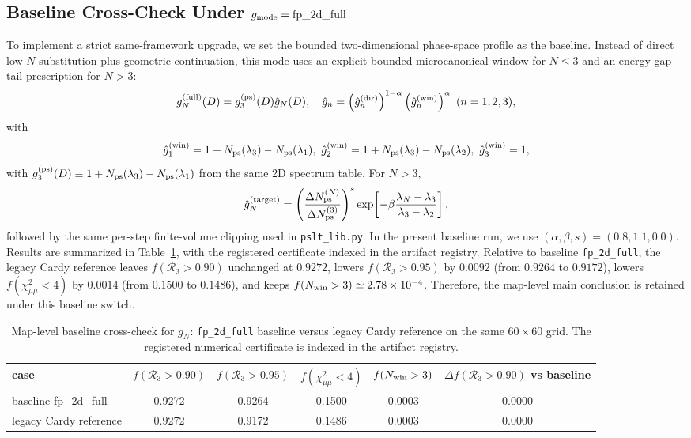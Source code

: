 \documentclass[aps,prd,onecolumn,notitlepage,nofootinbib,superscriptaddress,11pt,floatfix]{revtex4-2}
\begin{document}
\subsection{Baseline Cross-Check Under \texorpdfstring{$g_{\rm mode}=\mathrm{fp\_2d\_full}$}{g mode fp 2d full}}
To implement a strict same-framework upgrade, we set the bounded two-dimensional phase-space profile as the baseline. Instead of direct low-$N$ substitution plus geometric continuation, this mode uses an explicit bounded microcanonical window for $N\le 3$ and an energy-gap tail prescription for $N>3$:
\begin{equation}
g_N^{\rm(full)}(D)=g_3^{\rm(ps)}(D)\hat g_N(D),\quad
\hat g_n=\left(\hat g_n^{\rm(dir)}\right)^{1-\alpha}\left(\hat g_n^{\rm(win)}\right)^{\alpha}\ (n=1,2,3),
\end{equation}
with
\begin{equation}
\hat g_1^{\rm(win)}=1+N_{\rm ps}(\lambda_3)-N_{\rm ps}(\lambda_1),\ 
\hat g_2^{\rm(win)}=1+N_{\rm ps}(\lambda_3)-N_{\rm ps}(\lambda_2),\ 
\hat g_3^{\rm(win)}=1,
\end{equation}
with $g_3^{\rm(ps)}(D)\equiv 1+N_{\rm ps}(\lambda_3)-N_{\rm ps}(\lambda_1)$ from the same 2D spectrum table.
For $N>3$,
\begin{equation}
\hat g_N^{\rm(target)}=\left(\frac{\Delta N_{\rm ps}^{(N)}}{\Delta N_{\rm ps}^{(3)}}\right)^{s}
\exp\!\left[-\beta\frac{\lambda_N-\lambda_3}{\lambda_3-\lambda_2}\right],
\end{equation}
followed by the same per-step finite-volume clipping used in \texttt{pslt\_lib.py}. In the present baseline run, we use $(\alpha,\beta,s)=(0.8,1.1,0.0)$. Results are summarized in Table~\ref{tab:gn_baseline_replacement}, with the registered certificate indexed in the artifact registry. Relative to baseline \texttt{fp\_2d\_full}, the legacy Cardy reference leaves $f(\mathcal{R}_3>0.90)$ unchanged at $0.9272$, lowers $f(\mathcal{R}_3>0.95)$ by $0.0092$ (from $0.9264$ to $0.9172$), lowers $f(\chi^2_{\mu\mu}<4)$ by $0.0014$ (from $0.1500$ to $0.1486$), and keeps $f(N_{\rm win}>3)\simeq2.78\times10^{-4}$. Therefore, the map-level main conclusion is retained under this baseline switch.

\begin{table}[t]
\centering
\caption{Map-level baseline cross-check for $g_N$: \texttt{fp\_2d\_full} baseline versus legacy Cardy reference on the same $60\times60$ grid. The registered numerical certificate is indexed in the artifact registry.}
\label{tab:gn_baseline_replacement}
\scriptsize
\begin{tabular}{lccccc}
\hline\hline
case & $f(\mathcal{R}_3>0.90)$ & $f(\mathcal{R}_3>0.95)$ & $f(\chi^2_{\mu\mu}<4)$ & $f(N_{\rm win}>3)$ & $\Delta f(\mathcal{R}_3>0.90)$ vs baseline \\
\hline
baseline fp\_2d\_full & 0.9272 & 0.9264 & 0.1500 & 0.0003 & 0.0000 \\
legacy Cardy reference & 0.9272 & 0.9172 & 0.1486 & 0.0003 & 0.0000 \\
\hline\hline
\end{tabular}
\end{table}
\end{document}
